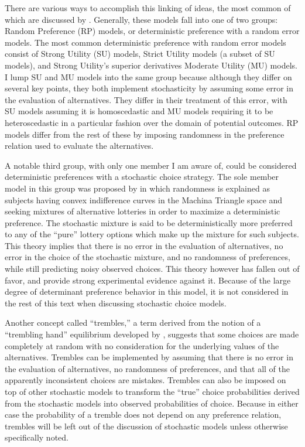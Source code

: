 \documentclass[../main.tex]{subfiles}
\begin{document}
There are various ways to accomplish this linking of ideas, the most common of which are discussed by \textcite{Wilcox2008}.
Generally, these models fall into one of two groups: Random Preference (RP) models, or deterministic preference with a random error models.
The most common deterministic preference with random error models consist of Strong Utility (SU) models, Strict Utility models (a subset of SU models), and Strong Utility's superior derivatives Moderate Utility (MU) models.
I lump SU and MU models into the same group because although they differ on several key points, they both implement stochasticity by assuming some error in the evaluation of alternatives.
They differ in their treatment of this error, with SU models assuming it is homoscedastic and MU models requiring it to be heteroscedastic in a particular fashion over the domain of potential outcomes.
RP models differ from the rest of these by imposing randomness in the preference relation used to evaluate the alternatives.

A notable third group, with only one member I am aware of, could be considered deterministic preferences with a stochastic choice strategy.
The sole member model in this group was proposed by \textcite{Machina1985} in which randomness is explained as subjects having convex indifference curves in the Machina Triangle space \textcite{Machina1987} and seeking mixtures of alternative lotteries in order to maximize a deterministic preference.
The stochastic mixture is said to be deterministically more preferred to any of the \enquote{pure} lottery options which make up the mixture for such subjects.
This theory implies that there is no error in the evaluation of alternatives, no error in the choice of the stochastic mixture, and no randomness of preferences, while still predicting noisy observed choices.
This theory however has fallen out of favor, and \textcite{Hey1995} provide strong experimental evidence against it.
Because of the large degree of determinant preference behavior in this model, it is not considered in the rest of this text when discussing stochastic choice models.

Another concept called \enquote{trembles,} a term derived from the notion of a \enquote{trembling hand} equilibrium developed by \textcite{Selten1975}, suggests that some choices are made completely at random with no consideration for the underlying values of the alternatives.
Trembles can be implemented by assuming that there is no error in the evaluation of alternatives, no randomness of preferences, and that all of the apparently inconsistent choices are mistakes.
Trembles can also be imposed on top of other stochastic models to transform the \enquote{true} choice probabilities derived from the stochastic models into observed probabilities of choice.
Because in either case the probability of a tremble does not depend on any preference relation, trembles will be left out of the discussion of stochastic models unless otherwise specifically noted.
\end{document}
